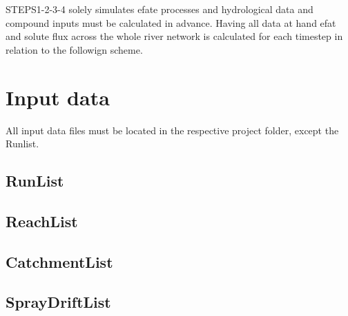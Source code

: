 \documentclass[letterpaper,10pt,english]{sphinxmanual}
\begin{document}
STEPS1-2-3-4 solely simulates efate processes and hydrological data and compound inputs must be calculated in advance. Having all data at hand efat and solute flux across the whole river network is calculated for each timestep in relation to the followign scheme.

\begin{figure}[htbp]
\centering

\noindent{}
\end{figure}


\chapter{Input data}
\label{\detokenize{index:input-data}}
All input data files must be located in the respective project folder, except the Runlist.


\section{RunList}
\label{\detokenize{index:runlist}}
\begin{figure}[htbp]
\centering

\noindent{}
\end{figure}


\section{ReachList}
\label{\detokenize{index:reachlist}}
\begin{figure}[htbp]
\centering

\noindent{}
\end{figure}


\section{CatchmentList}
\label{\detokenize{index:catchmentlist}}
\begin{figure}[htbp]
\centering

\noindent{}
\end{figure}


\section{SprayDriftList}
\label{\detokenize{index:spraydriftlist}}
\begin{figure}[htbp]
\centering

\noindent{}
\end{figure}
\end{document}
